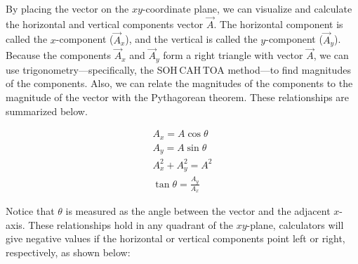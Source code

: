 \documentclass[dvipsnames]{article}
\begin{document}
By placing the vector on the $xy$-coordinate plane, we can visualize and calculate the horizontal and vertical components vector $\vec{A}$. The horizontal component is called the $x$-component ($\vec{A}_x$), and the vertical is called the $y$-component ($\vec{A}_y$). Because the components $\vec{A}_x$ and $\vec{A}_y$ form a right triangle with vector $\vec{A}$, we can use trigonometry---specifically, the SOH\,CAH\,TOA method---to find magnitudes of the components. Also, we can relate the magnitudes of the components to the magnitude of the vector with the Pythagorean theorem. These relationships are summarized below.

\begin{center}
\begin{minipage}{0.3\textwidth}
\centering
{}
\end{minipage}%
\begin{minipage}{0.3\textwidth}
\begin{gather*}
    A_x = A\cos{\theta} \\[2pt]
    A_y = A\sin{\theta} \\[2pt]
    A_x^2 + A_y^2 = A^2 \\[2pt]
    \tan{\theta} = \frac{A_y}{A_x}
\end{gather*}
\vspace{2em}
\end{minipage}
\end{center}

Notice that $\theta$ is measured as the angle between the vector and the adjacent $x$-axis. These relationships hold in any quadrant of the $xy$-plane, calculators will give negative values if the horizontal or vertical components point left or right, respectively, as shown below:
\end{document}
